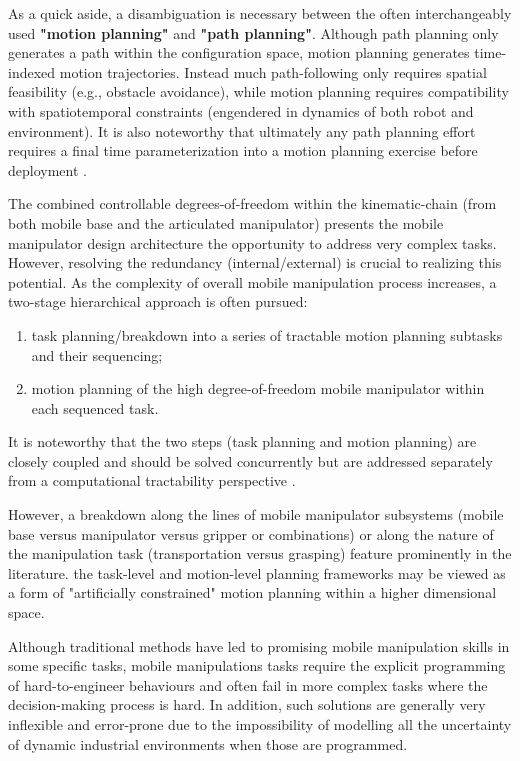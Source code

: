 As a quick aside, a disambiguation is necessary between the often interchangeably used
\textbf{"motion planning"} and \textbf{"path planning"}.
Although path planning only generates a path within the configuration space,
motion planning generates time-indexed motion trajectories. Instead much path-following only requires
spatial feasibility (e.g., obstacle avoidance), while motion planning
requires compatibility with spatiotemporal constraints (engendered in dynamics of both robot and
environment). It is also noteworthy that ultimately any path planning effort requires a final time
parameterization into a motion planning exercise before deployment \cite{thakar2023survey}.

The combined controllable degrees-of-freedom within the kinematic-chain (from both
mobile base and the articulated manipulator) presents the mobile
manipulator design architecture the opportunity to address very
complex tasks. However, resolving the redundancy (internal/external) is crucial to realizing
this potential. As the complexity of overall mobile manipulation process
increases, a two-stage hierarchical approach is often pursued:
\begin{enumerate}
	\item task planning/breakdown into a series of tractable motion planning
	      subtasks and their sequencing;
	\item motion planning of the high
	      degree-of-freedom mobile manipulator within each sequenced
	      task.
\end{enumerate}
It is noteworthy that the two steps (task planning and motion planning) are closely coupled
and should be solved concurrently but are addressed separately from a computational tractability
perspective \cite{thakar2023survey}.

However, a breakdown along the lines of mobile manipulator subsystems
(mobile base versus manipulator versus gripper or combinations)
or along the nature of the manipulation task (transportation versus grasping) feature prominently
in the literature. the task-level and motion-level planning frameworks
may be viewed as a form of "artificially constrained" motion planning within a higher dimensional space.

Although traditional methods have led to promising mobile manipulation skills in some specific tasks,
mobile manipulations tasks require the explicit programming of hard-to-engineer behaviours and often fail
in more complex tasks where the decision-making process is hard. In addition, such solutions
are generally very inflexible and error-prone due to the impossibility
of modelling all the uncertainty of dynamic industrial environments when those are programmed.

